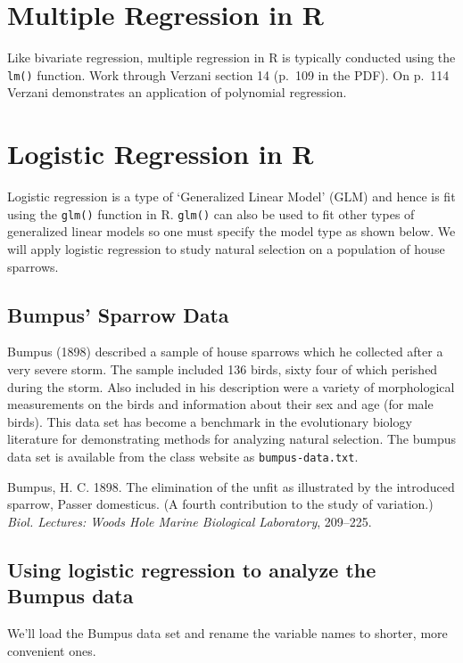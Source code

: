 \documentclass{article}
\begin{document}
\section{Multiple Regression in R}

Like bivariate regression, multiple regression in R is typically
conducted using the \lstinline!lm()! function. Work through Verzani
section 14 (p.~109 in the PDF). On p.~114 Verzani demonstrates an
application of polynomial regression.

\section{Logistic Regression in R}

Logistic regression is a type of `Generalized Linear Model' (GLM) and
hence is fit using the \lstinline!glm()! function in R.
\lstinline!glm()! can also be used to fit other types of generalized
linear models so one must specify the model type as shown below. We will
apply logistic regression to study natural selection on a population of
house sparrows.

\subsection{Bumpus' Sparrow Data}

Bumpus (1898) described a sample of house sparrows which he collected
after a very severe storm. The sample included 136 birds, sixty four of
which perished during the storm. Also included in his description were a
variety of morphological measurements on the birds and information about
their sex and age (for male birds). This data set has become a benchmark
in the evolutionary biology literature for demonstrating methods for
analyzing natural selection. The bumpus data set is available from the
class website as \lstinline!bumpus-data.txt!.

Bumpus, H. C. 1898. The elimination of the unfit as illustrated by the
introduced sparrow, Passer domesticus. (A fourth contribution to the
study of variation.) \emph{Biol. Lectures: Woods Hole Marine Biological
Laboratory}, 209--225.

\subsection{Using logistic regression to analyze the Bumpus data}

We'll load the Bumpus data set and rename the variable names to shorter,
more convenient ones.
\end{document}
